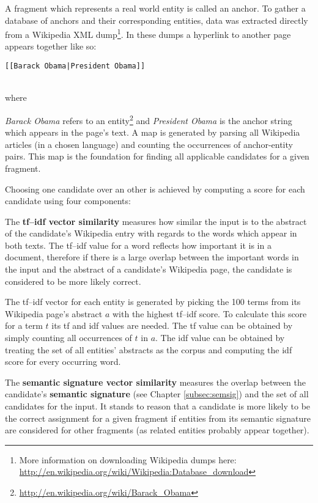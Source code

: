 \documentclass[runningheads,a4paper]{llncs}
\begin{document}
A fragment which represents a real world entity is called an anchor. To gather a database of anchors and their corresponding entities, data was extracted directly from a Wikipedia XML dump\footnote{More information on downloading Wikipedia dumps here: \url{http://en.wikipedia.org/wiki/Wikipedia:Database_download}}. In these dumps a hyperlink to another page appears together like so:\\
\centerline{\tt{[[Barack Obama|President Obama]]}}\\
where {\textit{Barack Obama} refers to an entity\footnote{\url{http://en.wikipedia.org/wiki/Barack_Obama}} and \textit{President Obama} is the anchor string which appears in the page's text. A map is generated by parsing all Wikipedia articles (in a chosen language) and counting the occurrences of anchor-entity pairs. This map is the foundation for finding all applicable candidates for a given fragment.

Choosing one candidate over an other is achieved by computing a score for each candidate using four components:

The \textbf{tf--idf vector similarity} measures how similar the input is to the abstract of the candidate's Wikipedia entry with regards to the words which appear in both texts. The tf--idf value for a word reflects how important it is in a document, therefore if there is a large overlap between the important words in the input and the abstract of a candidate's Wikipedia page, the candidate is considered to be more likely correct.

The tf--idf vector for each entity is generated by picking the 100 terms from its Wikipedia page's abstract $a$ with the highest tf--idf score. To calculate this score for a term $t$ its tf and idf values are needed. The tf value can be obtained by simply counting all occurrences of $t$ in $a$. The idf value can be obtained by treating the set of all entities' abstracts as the corpus and computing the idf score for every occurring word.


The \textbf{semantic signature vector similarity} measures the overlap between the candidate's \textbf{semantic signature} (see Chapter \ref{subsec:semsig}) and the set of all candidates for the input. It stands to reason that a candidate is more likely to be the correct assignment for a given fragment if entities from its semantic signature are considered for other fragments (as related entities probably appear together).

}
\end{document}
